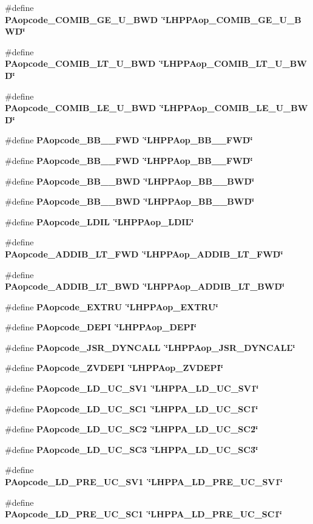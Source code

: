 \begin{CompactItemize}
\#define \bf{PAopcode\_\-COMIB\_\-GE\_\-U\_\-BWD}~\char`\"{}LHPPAop\_\-COMIB\_\-GE\_\-U\_\-BWD\char`\"{}
\item 
\#define \bf{PAopcode\_\-COMIB\_\-LT\_\-U\_\-BWD}~\char`\"{}LHPPAop\_\-COMIB\_\-LT\_\-U\_\-BWD\char`\"{}
\item 
\#define \bf{PAopcode\_\-COMIB\_\-LE\_\-U\_\-BWD}~\char`\"{}LHPPAop\_\-COMIB\_\-LE\_\-U\_\-BWD\char`\"{}
\item 
\#define \bf{PAopcode\_\-BB\_\_\-FWD}~\char`\"{}LHPPAop\_\-BB\_\_\-FWD\char`\"{}
\item 
\#define \bf{PAopcode\_\-BB\_\_\-FWD}~\char`\"{}LHPPAop\_\-BB\_\_\-FWD\char`\"{}
\item 
\#define \bf{PAopcode\_\-BB\_\_\-BWD}~\char`\"{}LHPPAop\_\-BB\_\_\-BWD\char`\"{}
\item 
\#define \bf{PAopcode\_\-BB\_\_\-BWD}~\char`\"{}LHPPAop\_\-BB\_\_\-BWD\char`\"{}
\item 
\#define \bf{PAopcode\_\-LDIL}~\char`\"{}LHPPAop\_\-LDIL\char`\"{}
\item 
\#define \bf{PAopcode\_\-ADDIB\_\-LT\_\-FWD}~\char`\"{}LHPPAop\_\-ADDIB\_\-LT\_\-FWD\char`\"{}
\item 
\#define \bf{PAopcode\_\-ADDIB\_\-LT\_\-BWD}~\char`\"{}LHPPAop\_\-ADDIB\_\-LT\_\-BWD\char`\"{}
\item 
\#define \bf{PAopcode\_\-EXTRU}~\char`\"{}LHPPAop\_\-EXTRU\char`\"{}
\item 
\#define \bf{PAopcode\_\-DEPI}~\char`\"{}LHPPAop\_\-DEPI\char`\"{}
\item 
\#define \bf{PAopcode\_\-JSR\_\-DYNCALL}~\char`\"{}LHPPAop\_\-JSR\_\-DYNCALL\char`\"{}
\item 
\#define \bf{PAopcode\_\-ZVDEPI}~\char`\"{}LHPPAop\_\-ZVDEPI\char`\"{}
\item 
\#define \bf{PAopcode\_\-LD\_\-UC\_\-SV1}~\char`\"{}LHPPA\_\-LD\_\-UC\_\-SV1\char`\"{}
\item 
\#define \bf{PAopcode\_\-LD\_\-UC\_\-SC1}~\char`\"{}LHPPA\_\-LD\_\-UC\_\-SC1\char`\"{}
\item 
\#define \bf{PAopcode\_\-LD\_\-UC\_\-SC2}~\char`\"{}LHPPA\_\-LD\_\-UC\_\-SC2\char`\"{}
\item 
\#define \bf{PAopcode\_\-LD\_\-UC\_\-SC3}~\char`\"{}LHPPA\_\-LD\_\-UC\_\-SC3\char`\"{}
\item 
\#define \bf{PAopcode\_\-LD\_\-PRE\_\-UC\_\-SV1}~\char`\"{}LHPPA\_\-LD\_\-PRE\_\-UC\_\-SV1\char`\"{}
\item 
\#define \bf{PAopcode\_\-LD\_\-PRE\_\-UC\_\-SC1}~\char`\"{}LHPPA\_\-LD\_\-PRE\_\-UC\_\-SC1\char`\"{}

\end{CompactItemize}

